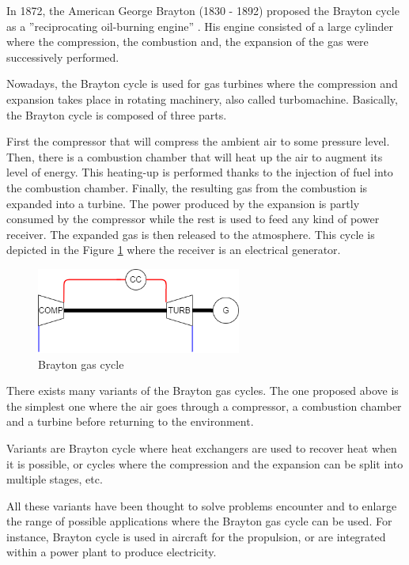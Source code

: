 In 1872, the American George Brayton (1830 - 1892) proposed the Brayton cycle as a ''reciprocating oil-burning engine'' \cite{Boles2006}. His engine consisted of a large cylinder where the compression, the combustion and, the expansion of the gas were successively performed. 

Nowadays, the Brayton cycle is used for gas turbines where the compression and expansion takes place in rotating machinery, also called turbomachine. Basically, the Brayton cycle is composed of three parts. 

First the compressor that will compress the ambient air to some pressure level. Then, there is a combustion chamber that will heat up the air to augment its level of energy. This heating-up is performed thanks to the injection of fuel into the combustion chamber. Finally, the resulting gas from the combustion is expanded into a turbine. The power produced by the expansion is partly consumed by the compressor while the rest is used to feed any kind of power receiver. The expanded gas is then released to the atmosphere. This cycle is depicted in the Figure \ref{fig:C1_GT} where the receiver is an electrical generator.

\begin{figure}[h]
    \centering
    \includegraphics[width=0.6\textwidth]{Chapitre_1/Images/GT.png}
    \caption{Brayton gas cycle}
    \label{fig:C1_GT}
\end{figure}
There exists many variants of the Brayton gas cycles. The one proposed above is the simplest one where the air goes through a compressor, a combustion chamber and a turbine before returning to the environment. 

Variants are Brayton cycle where heat exchangers are used to recover heat when it is possible, or cycles where the compression and the expansion can be split into multiple stages, etc.

All these variants have been thought to solve problems encounter and to enlarge the range of possible applications where the Brayton gas cycle can be used. For instance, Brayton cycle is used in aircraft for the propulsion, or are integrated within a power plant to produce electricity.\\


